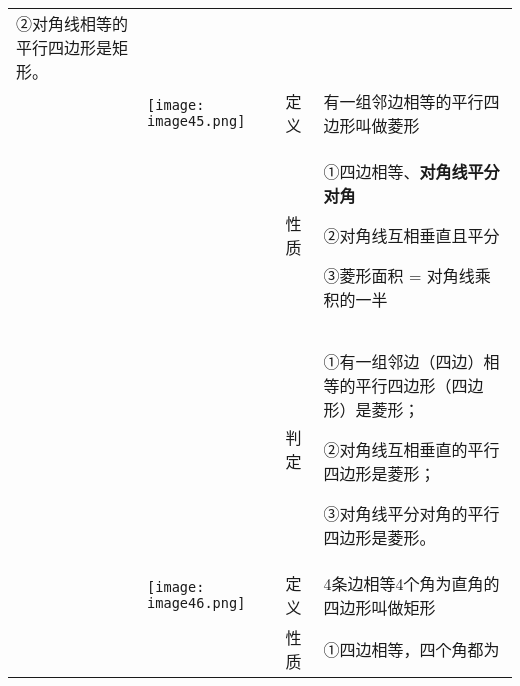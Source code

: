 \begin{longtable}[]{@{}llll@{}}
\begin{minipage}[t]{0.22\columnwidth}
②对角线相等的平行四边形是矩形。\strut
\end{minipage}\tabularnewline
&
\texttt{[image: image45.png]}
& 定义 & 有一组邻边相等的平行四边形叫做菱形\tabularnewline
\begin{minipage}[t]{0.22\columnwidth}\raggedright
\strut
\end{minipage} & \begin{minipage}[t]{0.22\columnwidth}\raggedright
\strut
\end{minipage} & \begin{minipage}[t]{0.22\columnwidth}\raggedright
性质\strut
\end{minipage} & \begin{minipage}[t]{0.22\columnwidth}\raggedright
①四边相等、\textbf{对角线平分对角}

②对角线互相垂直且平分

③菱形面积 = 对角线乘积的一半\strut
\end{minipage}\tabularnewline
\begin{minipage}[t]{0.22\columnwidth}\raggedright
\strut
\end{minipage} & \begin{minipage}[t]{0.22\columnwidth}\raggedright
\strut
\end{minipage} & \begin{minipage}[t]{0.22\columnwidth}\raggedright
判定\strut
\end{minipage} & \begin{minipage}[t]{0.22\columnwidth}\raggedright
①有一组邻边（四边）相等的平行四边形（四边形）是菱形；

②对角线互相垂直的平行四边形是菱形；

③对角线平分对角的平行四边形是菱形。\strut
\end{minipage}\tabularnewline
&
\texttt{[image: image46.png]}
& 定义 & 4条边相等4个角为直角的四边形叫做矩形\tabularnewline
\begin{minipage}[t]{0.22\columnwidth}\raggedright
\strut
\end{minipage} & \begin{minipage}[t]{0.22\columnwidth}\raggedright
\strut
\end{minipage} & \begin{minipage}[t]{0.22\columnwidth}\raggedright
性质\strut
\end{minipage} & \begin{minipage}[t]{0.22\columnwidth}\raggedright
①四边相等，四个角都为


\end{minipage}
\end{longtable}
